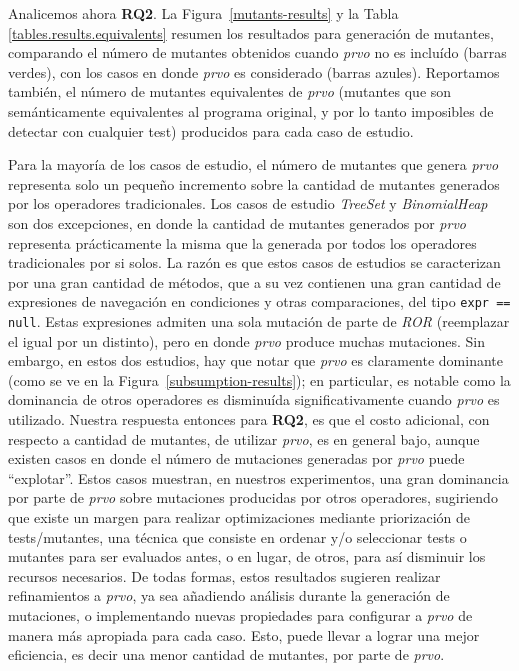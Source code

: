 Analicemos ahora \textbf{RQ2}. La Figura~\ref{mutants-results} y la Tabla \ref{tables.results.equivalents} resumen los resultados para generaci\'on de mutantes, comparando el n\'umero de mutantes obtenidos cuando \emph{prvo} no es inclu\'ido (barras verdes), con los casos en donde \emph{prvo} es considerado (barras azules). Reportamos tambi\'en, el n\'umero de mutantes equivalentes de \emph{prvo} (mutantes que son sem\'anticamente equivalentes al programa original, y por lo tanto imposibles de detectar con cualquier test) producidos para cada caso de estudio.

Para la mayor\'ia de los casos de estudio, el n\'umero de mutantes que genera \emph{prvo} representa solo un peque\~no incremento sobre la cantidad de mutantes generados por los operadores tradicionales. Los casos de estudio \emph{TreeSet} y \emph{BinomialHeap} son dos excepciones, en donde la cantidad de mutantes generados por \emph{prvo} representa pr\'acticamente la misma que la generada por todos los operadores tradicionales por si solos. La raz\'on es que estos casos de estudios se caracterizan por una gran cantidad de m\'etodos, que a su vez contienen una gran cantidad de expresiones de navegaci\'on en condiciones y otras comparaciones, del tipo \texttt{expr == null}. Estas expresiones admiten una sola mutaci\'on de parte de \emph{ROR} (reemplazar el igual por un distinto), pero en donde \emph{prvo} produce muchas mutaciones. Sin embargo, en estos dos estudios, hay que notar que \emph{prvo} es claramente dominante (como se ve en la Figura~\ref{subsumption-results}); en particular, es notable como la dominancia de otros operadores es disminu\'ida significativamente cuando \emph{prvo} es utilizado. Nuestra respuesta entonces para \textbf{RQ2}, es que el costo adicional, con respecto a cantidad de mutantes, de utilizar \emph{prvo}, es en general bajo, aunque existen casos en donde el n\'umero de mutaciones generadas por \emph{prvo} puede ``explotar''. Estos casos muestran, en nuestros experimentos, una gran dominancia por parte de \emph{prvo} sobre mutaciones producidas por otros operadores, sugiriendo que existe un margen para realizar optimizaciones mediante priorizaci\'on de tests/mutantes, una t\'ecnica que consiste en ordenar y/o seleccionar tests o mutantes para ser evaluados antes, o en lugar, de otros, para as\'i disminuir los recursos necesarios. De todas formas, estos resultados sugieren realizar refinamientos a \emph{prvo}, ya sea a\~nadiendo an\'alisis durante la generaci\'on de mutaciones, o implementando nuevas propiedades para configurar a \emph{prvo} de manera m\'as apropiada para cada caso. Esto, puede llevar a lograr una mejor eficiencia, es decir una menor cantidad de mutantes, por parte de \emph{prvo}.


